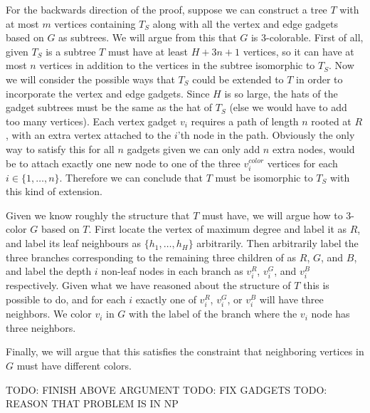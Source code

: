 For the backwards direction of the proof, suppose we can
construct a tree $T$ with at most $m$ vertices containing
$T_S$ along with all the vertex and edge gadgets based on
$G$ as subtrees. We will argue from this that $G$ is 3-colorable.
First of all, given $T_S$ is a subtree $T$ must have at least
$H + 3n + 1$ vertices, so it can have at most $n$ vertices
in addition to the vertices in the subtree isomorphic to $T_S$.
Now we will consider the possible ways that $T_S$ could be
extended to $T$ in order to incorporate the vertex and
edge gadgets. Since $H$ is so large, the hats of the gadget
subtrees must be the same as the hat of $T_S$ (else we would
have to add too many vertices).
Each vertex gadget $v_i$ requires
a path of length $n$ rooted at $R$, with an extra vertex
attached to the $i$'th node in the path. Obviously the
only way to satisfy this for all $n$ gadgets given we can
only add $n$ extra nodes,
would be to attach exactly one new node to one
of the three $v_i^{color}$ vertices for each
$i \in \{1,\ldots,n\}$. Therefore we can conclude that $T$
must be isomorphic to $T_S$ with this kind of extension.

Given we know roughly the structure that $T$ must have,
we will argue how to 3-color $G$ based on $T$. First
locate the vertex of maximum degree and label it as $R$,
and label its leaf neighbours as $\{h_1,\ldots,h_H\}$
arbitrarily. Then arbitrarily label the three branches
corresponding to the remaining three children of as $R$,
$G$, and $B$, and label the depth $i$ non-leaf nodes
in each branch as $v_i^R$, $v_i^G$, and $v_i^B$
respectively. Given what we have reasoned about
the structure of $T$ this is possible to do, and for
each $i$ exactly one of $v_i^R$, $v_i^G$, or $v_i^B$
will have three neighbors. We color $v_i$ in $G$
with the label of the branch where the $v_i$ node
has three neighbors.

Finally, we will argue that this
satisfies the constraint that neighboring vertices
in $G$ must have different colors.

TODO: FINISH ABOVE ARGUMENT
TODO: FIX GADGETS
TODO: REASON THAT PROBLEM IS IN NP





